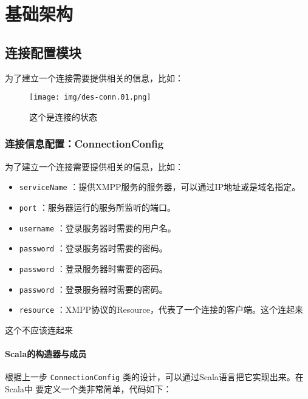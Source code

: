 

\chapter{基础架构}



\section{连接配置模块}

为了建立一个连接需要提供相关的信息，比如：




\begin{figure}[htbp]\centering
					\texttt{[image: img/des-conn.01.png]}\caption{这个是连接的状态}\label{fig:des-conn.01.png}
					\end{figure}



\subsection{连接信息配置：ConnectionConfig}

为了建立一个连接需要提供相关的信息，比如：




\begin{itemize}
	\item   \verb|serviceName| ：提供XMPP服务的服务器，可以通过IP地址或是域名指定。
	\item   \verb|port| ：服务器运行的服务所监听的端口。
	\item   \verb|username| ：登录服务器时需要的用户名。
	\item   \verb|password| ：登录服务器时需要的密码。
	\item   \verb|password| ：登录服务器时需要的密码。
	\item   \verb|password| ：登录服务器时需要的密码。
	\item   \verb|resource| ：XMPP协议的Resource，代表了一个连接的客户端。这个连起来

\end{itemize}

这个不应该连起来




\subsubsection{Scala的构造器与成员}

根据上一步  \verb|ConnectionConfig| 类的设计，可以通过Scala语言把它实现出来。在Scala中
要定义一个类非常简单，代码如下：




